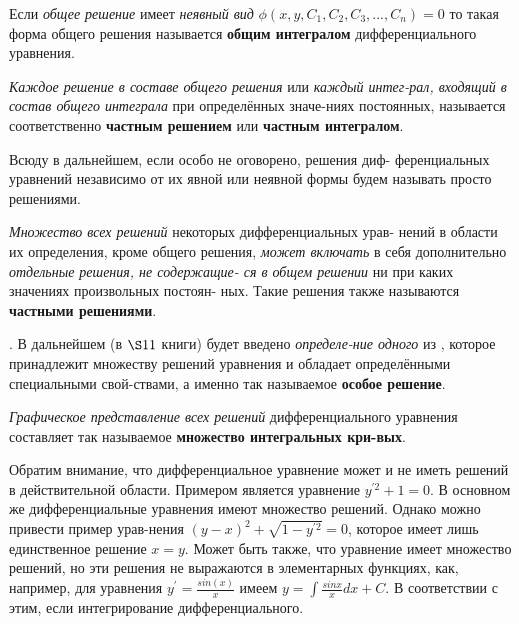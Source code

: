 \documentclass[10pt]{article}
\begin{document}
\begin{justify}
Если \textit{общее решение} имеет \textit{неявный вид} ${\displaystyle \phi(x,y,C_1,C_2,C_3,...,C_n)=0}$ то такая форма общего решения называется \textbf{\large{общим интегралом}} дифференциального уравнения.

\textit{Каждое решение в составе общего решения} или \textit{каждый интег-рал, входящий в состав общего интеграла} при определённых значе-ниях постоянных, называется соответственно \textbf{\large частным решением} или
\textbf{\large частным интегралом}.

Всюду в дальнейшем, если особо не оговорено, решения диф-
ференциальных уравнений независимо от их явной или неявной
формы будем называть просто решениями.

\textit{Множество всех решений} некоторых дифференциальных урав-
нений в области их определения, кроме общего решения, \textit{может
включать} в себя дополнительно \textit{отдельные решения, не содержащие-
ся в общем решении} ни при каких значениях произвольных постоян-
ных. Такие решения также называются \textbf{\large частными решениями}.

. В дальнейшем (в $\S11$ книги) будет введено \textit{определе-ние одного} из , которое принадлежит множеству
решений уравнения и обладает определёнными специальными свой-ствами, а именно так называемое \textbf{\large особое решение}.

\textit{Графическое представление всех решений} дифференциального
уравнения составляет так называемое \textbf{\large множество интегральных кри-вых}.

Обратим внимание, что дифференциальное уравнение может и
не иметь решений в действительной области. Примером является уравнение ${\displaystyle y^{'2} + 1 = 0 }$. В основном же дифференциальные уравнения имеют множество решений. Однако можно привести пример урав-нения ${\displaystyle (y-x)^{2}+\sqrt{1-y^{'2}}=0}$, которое имеет лишь единственное решение ${\displaystyle x=y}$. Может быть также, что уравнение имеет множество решений, но эти решения не выражаются в элементарных функциях, как, например, для уравнения ${\displaystyle y^{'}=\frac{sin(x)}{x}}$ имеем ${\displaystyle y=\int{\frac{sinx}{x}dx}+C}$.
\newline
В соответствии с этим, если интегрирование дифференциального.

\end{justify}
\end{document}
